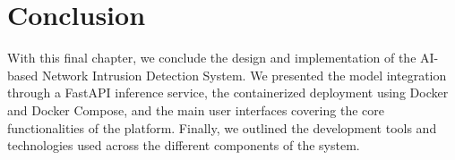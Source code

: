 \vspace{-0.6cm}
\section{Conclusion}
\vspace{-0.3cm}
With this final chapter, we conclude the design and implementation of the AI-based Network Intrusion Detection System. We presented the model integration through a FastAPI inference service, the containerized deployment using Docker and Docker Compose, and the main user interfaces covering the core functionalities of the platform. Finally, we outlined the development tools and technologies used across the different components of the system.
